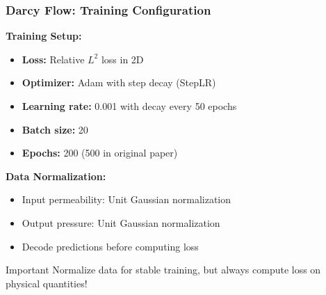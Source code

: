 \documentclass{beamer}
\begin{document}
\begin{frame}
\frametitle{Darcy Flow: Training Configuration}

\textbf{Training Setup:}
\begin{itemize}
    \item \textbf{Loss:} Relative $L^2$ loss in 2D
    \item \textbf{Optimizer:} Adam with step decay (StepLR)
    \item \textbf{Learning rate:} 0.001 with decay every 50 epochs
    \item \textbf{Batch size:} 20
    \item \textbf{Epochs:} 200 (500 in original paper)
\end{itemize}

\vspace{0.2cm}

\textbf{Data Normalization:}
\begin{itemize}
    \item Input permeability: Unit Gaussian normalization
    \item Output pressure: Unit Gaussian normalization
    \item Decode predictions before computing loss
\end{itemize}

\vspace{0.2cm}

\begin{alertblock}{Important}
Normalize data for stable training, but always compute loss on physical quantities!
\end{alertblock}

\end{frame}
\end{document}
